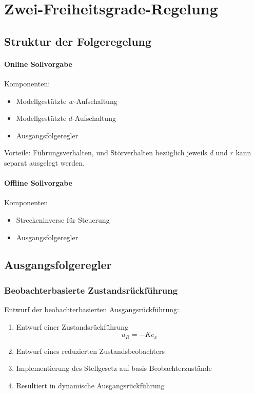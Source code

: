 \chapter{Zwei-Freiheitsgrade-Regelung}
\section{Struktur der Folgeregelung}
\subsubsection{Online Sollvorgabe}
Komponenten:
\begin{itemize}
    \item Modellgestützte $w$-Aufschaltung
    \item Modellgestützte $d$-Aufschaltung
    \item Ausgangsfolgeregler
\end{itemize}

Vorteile: Führungsverhalten, und Störverhalten bezüglich jeweils $d$ und $r$ kann
separat ausgelegt werden.

\subsubsection{Offline Sollvorgabe}
Komponenten
\begin{itemize}
    \item Streckeninverse für Steuerung
    \item Ausgangsfolgeregler
\end{itemize}

\section{Ausgangsfolgeregler}
\subsection{Beobachterbasierte Zustandsrückführung}
Entwurf der beobachterbasierten Ausgangsrückführung:
\begin{enumerate}
    \item Entwurf einer Zustandsrückführung
        \begin{equation}
            u_R = -K e_x
        \end{equation}
    \item Entwurf eines reduzierten Zustandsbeobachters
    \item Implementierung des Stellgesetz auf basis Beobachterzustände
    \item Resultiert in dynamische Ausgangsrückführung
\end{enumerate}

